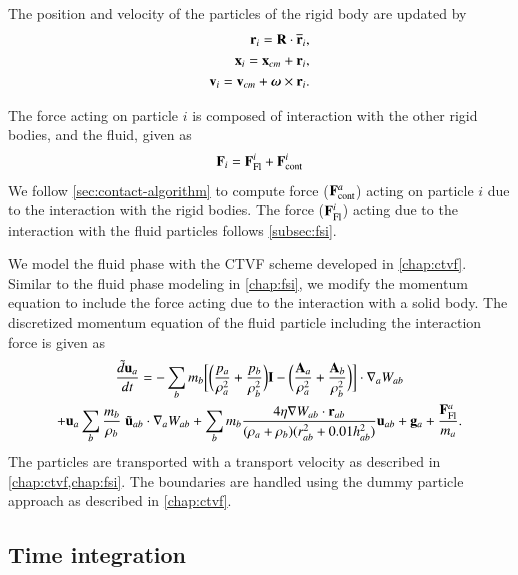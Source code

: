 The position and velocity of the particles of the rigid body are updated by
\begin{eqnarray}
  \label{eq:rfc:rb_particle_pos_update}
  \mathbf{r}_i = \mathbf{R} \cdot \overline{\mathbf{r}}_{i},\\
  \mathbf{x}_i = \mathbf{x}_{cm} + \mathbf{r}_{i},\\
  \mathbf{v}_i = \mathbf{v}_{cm} + \boldsymbol{\omega} \times \mathbf{r}_{i}.
\end{eqnarray}

The force acting on particle $i$ is composed of interaction with the other rigid
bodies, and the fluid, given as
\begin{eqnarray}
  \label{eq:rfc:rb_particle_pos_update}
  \mathbf{F}_i = \mathbf{F}_{\text{Fl}}^i + \mathbf{F}_{\text{cont}}^i
\end{eqnarray}
We follow \cref{sec:contact-algorithm} to compute force
($\mathbf{F}_{\text{cont}}^a$) acting on particle $i$ due to the interaction with
the rigid bodies. The force ($\mathbf{F}_{\text{Fl}}^i$) acting due to the
interaction with the fluid particles follows \cref{subsec:fsi}.

We model the fluid phase with the CTVF \citep{adepu2021corrected} scheme
developed in \cref{chap:ctvf}. Similar to the fluid phase modeling in
\cref{chap:fsi}, we modify the momentum equation to include the force acting due
to the interaction with a solid body. The discretized momentum equation of the
fluid particle including the interaction force is given as
\begin{multline}
  \label{eq:rfc:sph-momentum-fluid}
  \frac{\tilde{d}\mathbf{u}_{a}}{dt} = - \sum_{b} m_b \bigg[
  \bigg(\frac{p_a}{\rho_a^2} + \frac{p_b}{\rho_b^2}\bigg) \mathbf{I} -
  \bigg(\frac{\mathbf{A}_a}{\rho_a^2} + \frac{\mathbf{A}_b}{\rho_b^2}
  \bigg) \bigg]
  \cdot \nabla_{a} W_{ab} \\
  + \mathbf{u}_{a} \sum_{b} \frac{m_b}{\rho_{b}} \; \tilde{\mathbf{u}}_{ab} \cdot
  \nabla_{a} W_{ab} + \sum_{b} m_b \frac{4 \eta \nabla W_{ab}\cdot
    \mathbf{r}_{ab}}{(\rho_a + \rho_b) (r_{ab}^2 + 0.01 h_{ab}^2)} \mathbf{u}_{ab} +
  \mathbf{g}_{a} + \frac{\mathbf{F}^a_{\text{Fl}}}{m_a}.
\end{multline}
The particles are transported with a transport velocity as described in
\cref{chap:ctvf,chap:fsi}. The boundaries are handled using the dummy particle
approach as described in \cref{chap:ctvf}.

\subsection{Time integration}

